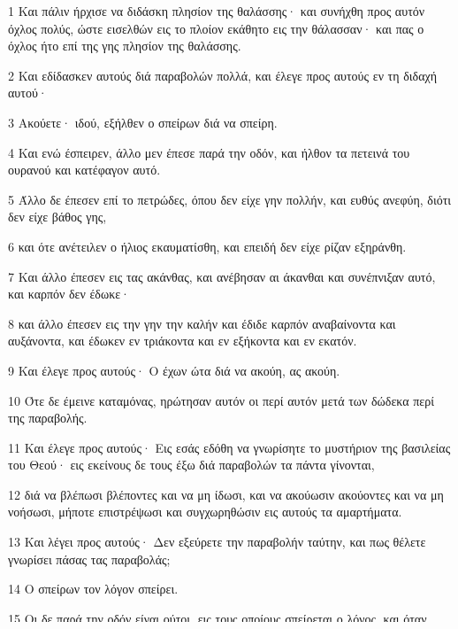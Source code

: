 \par 1 Και πάλιν ήρχισε να διδάσκη πλησίον της θαλάσσης· και συνήχθη προς αυτόν όχλος πολύς, ώστε εισελθών εις το πλοίον εκάθητο εις την θάλασσαν· και πας ο όχλος ήτο επί της γης πλησίον της θαλάσσης.
\par 2 Και εδίδασκεν αυτούς διά παραβολών πολλά, και έλεγε προς αυτούς εν τη διδαχή αυτού·
\par 3 Ακούετε· ιδού, εξήλθεν ο σπείρων διά να σπείρη.
\par 4 Και ενώ έσπειρεν, άλλο μεν έπεσε παρά την οδόν, και ήλθον τα πετεινά του ουρανού και κατέφαγον αυτό.
\par 5 Άλλο δε έπεσεν επί το πετρώδες, όπου δεν είχε γην πολλήν, και ευθύς ανεφύη, διότι δεν είχε βάθος γης,
\par 6 και ότε ανέτειλεν ο ήλιος εκαυματίσθη, και επειδή δεν είχε ρίζαν εξηράνθη.
\par 7 Και άλλο έπεσεν εις τας ακάνθας, και ανέβησαν αι άκανθαι και συνέπνιξαν αυτό, και καρπόν δεν έδωκε·
\par 8 και άλλο έπεσεν εις την γην την καλήν και έδιδε καρπόν αναβαίνοντα και αυξάνοντα, και έδωκεν εν τριάκοντα και εν εξήκοντα και εν εκατόν.
\par 9 Και έλεγε προς αυτούς· Ο έχων ώτα διά να ακούη, ας ακούη.
\par 10 Ότε δε έμεινε καταμόνας, ηρώτησαν αυτόν οι περί αυτόν μετά των δώδεκα περί της παραβολής.
\par 11 Και έλεγε προς αυτούς· Εις εσάς εδόθη να γνωρίσητε το μυστήριον της βασιλείας του Θεού· εις εκείνους δε τους έξω διά παραβολών τα πάντα γίνονται,
\par 12 διά να βλέπωσι βλέποντες και να μη ίδωσι, και να ακούωσιν ακούοντες και να μη νοήσωσι, μήποτε επιστρέψωσι και συγχωρηθώσιν εις αυτούς τα αμαρτήματα.
\par 13 Και λέγει προς αυτούς· Δεν εξεύρετε την παραβολήν ταύτην, και πως θέλετε γνωρίσει πάσας τας παραβολάς;
\par 14 Ο σπείρων τον λόγον σπείρει.
\par 15 Οι δε παρά την οδόν είναι ούτοι, εις τους οποίους σπείρεται ο λόγος, και όταν ακούσωσιν, ευθύς έρχεται ο Σατανάς, και αφαιρεί τον λόγον τον εσπαρμένον εν ταις καρδίαις αυτών.
\par 16 Και ομοίως οι επί τα πετρώδη σπειρόμενοι είναι ούτοι, οίτινες όταν ακούσωσι τον λόγον, ευθύς μετά χαράς δέχονται αυτόν,
\par 17 δεν έχουσιν όμως ρίζαν εν εαυτοίς, αλλ' είναι πρόσκαιροι· έπειτα όταν γείνη θλίψις ή διωγμός διά τον λόγον, ευθύς σκανδαλίζονται.
